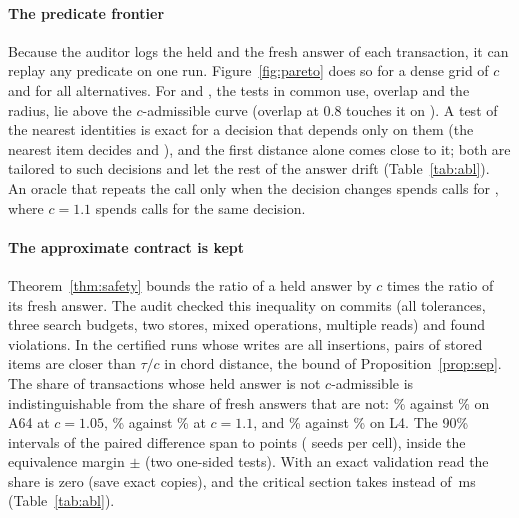 \documentclass[sigconf, nonacm, review]{acmart}
\begin{document}
\paragraph{The predicate frontier}
Because the auditor logs the held and the fresh answer of each
transaction, it can replay any predicate on one run.
Figure~\ref{fig:pareto} does so for a dense grid of $c$ and for all
alternatives. For  and , the tests in common use, overlap and the radius, lie above the $c$-admissible curve (overlap at 0.8 touches it on ). A test of the
nearest identities is exact for a decision that depends only on them
(the nearest item decides  and ), and the first
distance alone comes close to it; both are tailored to such decisions
and let the rest of the answer drift (Table~\ref{tab:abl}). An oracle that repeats the call only when the decision changes spends
 calls for , where $c=1.1$ spends
 calls for the same decision.

\paragraph{The approximate contract is kept}
Theorem~\ref{thm:safety} bounds the ratio of a held answer by $c$
times the ratio of its fresh answer. The audit checked this
inequality on  commits (all tolerances,
three search budgets, two stores, mixed operations, multiple reads)
and found  violations. In the certified runs whose
writes are all insertions,  pairs of stored items are
closer than $\tau/c$ in chord distance, the bound of Proposition~\ref{prop:sep}. The
share of transactions whose held answer is not $c$-admissible is indistinguishable from the share of
fresh answers that are not: \% against
\% on A64 at $c=1.05$, \%
against \% at $c=1.1$, and
\% against \% on L4. The 90\% intervals of the paired
difference span  to  points ( seeds per cell),
inside the equivalence margin $\pm$ (two one-sided tests). With an
exact validation read the share is zero (save exact copies), and the
critical section takes  instead of
\,ms (Table~\ref{tab:abl}).
\end{document}
